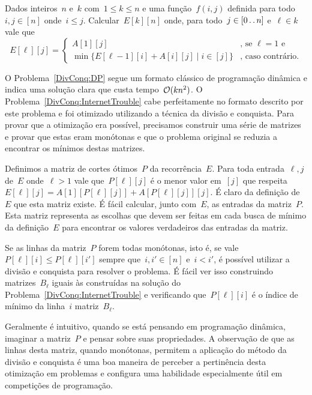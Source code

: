 \begin{prob} \label{DivConq:DP}
Dados inteiros~$n$ e~$k$ com~$1 \leq k \leq n$ e uma função~$f(i,j)$ definida para todo~${ i,j \in [n] }$ onde~$i \leq j$. Calcular~$E[k][n]$ onde, para todo~${ j \in [0 \,.\,.\, n] }$ e~${ \ell \in k }$ vale que
\begin{equation*}
E[\ell][j] = \begin{cases}
A[1][j] & \text{,  se } \ell = 1 \text{ e } \\
\min\{ E[\ell-1][i] + A[i][j] \mid i \in [j] \} & \text{, caso contrário.}
\end{cases}
\end{equation*}
\end{prob}

O Problema~\ref{DivConq:DP} segue um formato clássico de programação dinâmica e indica uma solução clara que custa tempo~$\mathcal{O}(kn^2)$. O Problema~\ref{DivConq:InternetTrouble} cabe perfeitamente no formato descrito por este problema e foi otimizado utilizando a técnica da divisão e conquista. Para provar que a otimização era possível, precisamos construir uma série de matrizes e provar que estas eram monótonas e que o problema original se reduzia a encontrar os mínimos destas matrizes.

Definimos a matriz de cortes ótimos~$P$ da recorrência~$E$. Para toda entrada~$\ell,j$ de~$E$ onde~$\ell > 1$ vale que~$P[\ell][j]$ é o menor valor em~$[j]$ que respeita~${ E[\ell][j] = A[1][P[\ell][j]] + A[P[\ell][j]][j] }$. É claro da definição de~$E$ que esta matriz existe. É fácil calcular, junto com~$E$, as entradas da matriz~$P$. Esta matriz representa as escolhas que devem ser feitas em cada busca de mínimo da definição~$E$ para encontrar os valores verdadeiros das entradas da matriz.

Se as linhas da matriz~$P$ forem todas monótonas, isto é, se vale~${ P[\ell][i] \leq P[\ell][i'] }$ sempre que~${ i,i' \in [n] }$ e~$i < i'$, é possível utilizar a divisão e conquista para resolver o problema. É fácil ver isso construindo matrizes~$B_\ell$ iguais às construídas na solução do Problema~\ref{DivConq:InternetTrouble} e verificando que~$P[\ell][i]$ é o índice de mínimo da linha~$i$ matriz~$B_\ell$.

Geralmente é intuitivo, quando se está pensando em programação dinâmica, imaginar a matriz~$P$ e pensar sobre suas propriedades. A observação de que as linhas desta matriz, quando monótonas, permitem a aplicação do método da divisão e conquista é uma boa maneira de perceber a pertinência desta otimização em problemas e configura uma habilidade especialmente útil em competições de programação.
